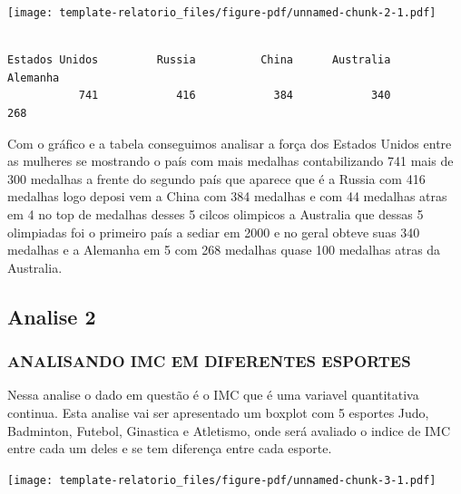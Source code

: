 \documentclass[
]{estat/estat}
\begin{document}
\texttt{[image: template-relatorio\_files/figure-pdf/unnamed-chunk-2-1.pdf]}

\begin{verbatim}

Estados Unidos         Russia          China      Australia       Alemanha 
           741            416            384            340            268 
\end{verbatim}

Com o gráfico e a tabela conseguimos analisar a força dos Estados Unidos
entre as mulheres se mostrando o país com mais medalhas contabilizando
741 mais de 300 medalhas a frente do segundo país que aparece que é a
Russia com 416 medalhas logo deposi vem a China com 384 medalhas e com
44 medalhas atras em 4 no top de medalhas desses 5 cilcos olimpicos a
Australia que dessas 5 olimpiadas foi o primeiro país a sediar em 2000 e
no geral obteve suas 340 medalhas e a Alemanha em 5 com 268 medalhas
quase 100 medalhas atras da Australia.

\subsection{Analise 2}\label{analise-2}

\subsubsection{ANALISANDO IMC EM DIFERENTES
ESPORTES}\label{analisando-imc-em-diferentes-esportes}

Nessa analise o dado em questão é o IMC que é uma variavel quantitativa
continua. Esta analise vai ser apresentado um boxplot com 5 esportes
Judo, Badminton, Futebol, Ginastica e Atletismo, onde será avaliado o
indice de IMC entre cada um deles e se tem diferença entre cada esporte.

\texttt{[image: template-relatorio\_files/figure-pdf/unnamed-chunk-3-1.pdf]}
\end{document}

